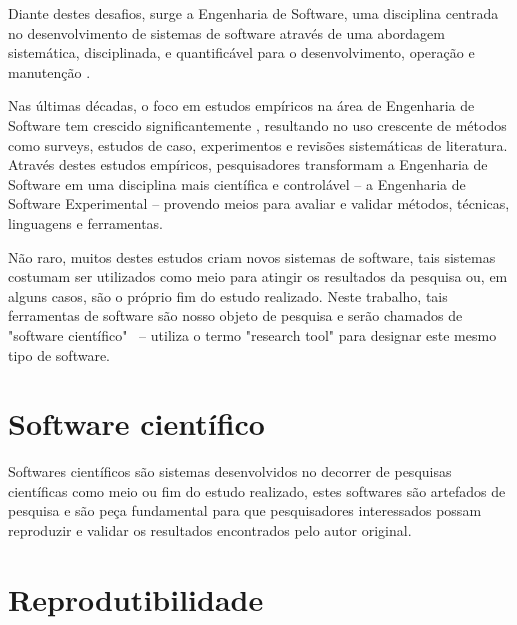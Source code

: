 \documentclass[qual, classic, a4paper]{ufbathesis}
\begin{document}
Diante destes desafios, surge a Engenharia de Software, uma disciplina
centrada no desenvolvimento de sistemas de software através
de uma abordagem sistemática, disciplinada, e quantificável para o
desenvolvimento, operação e manutenção \cite{SWEBOK2014}.


Nas últimas décadas, o foco em estudos empíricos na área de Engenharia de
Software tem crescido significantemente \cite{Stol2015}, resultando no uso
crescente de métodos como surveys, estudos de caso, experimentos e revisões
sistemáticas de literatura. Através destes estudos empíricos, pesquisadores
transformam a Engenharia de Software em uma disciplina mais científica e
controlável -- a  Engenharia de Software Experimental -- provendo meios para
avaliar e validar métodos, técnicas, linguagens e ferramentas.

Não raro, muitos destes estudos criam novos sistemas de software, tais
sistemas costumam ser utilizados como meio para atingir os resultados da
pesquisa ou, em alguns casos, são o próprio fim do estudo realizado. Neste
trabalho, tais ferramentas de software são nosso objeto de pesquisa e serão
chamados de "software científico" \ --  utiliza o termo
"research tool" para designar este mesmo tipo de software.


\section{Software científico}

Softwares científicos são sistemas desenvolvidos no decorrer de pesquisas
científicas como meio ou fim do estudo realizado, estes softwares são
artefados de pesquisa e são peça fundamental para que pesquisadores
interessados possam reproduzir e validar os resultados encontrados pelo autor
original.


\section{Reprodutibilidade}
\end{document}
